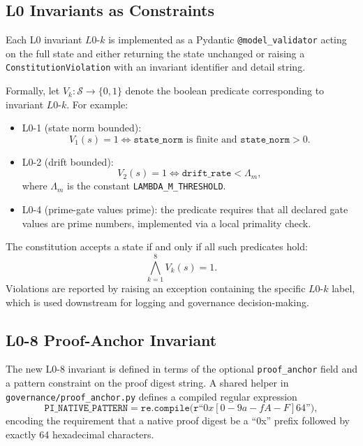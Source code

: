 \documentclass[11pt]{article}
\begin{document}
\subsection{L0 Invariants as Constraints}

Each L0 invariant \(L0\text{-}k\) is implemented as a Pydantic \texttt{@model\_validator} acting on the full state and either returning the state unchanged or raising a \texttt{ConstitutionViolation} with an invariant identifier and detail string.\cite{cite:40,cite:41,cite:42}

Formally, let \(V_k : \mathcal{S}\rightarrow\{0,1\}\) denote the boolean predicate corresponding to invariant \(L0\text{-}k\). For example:\cite{cite:40}
\begin{itemize}[nosep]
  \item L0-1 (state norm bounded):
  \[
    V_1(s) = 1 \iff \texttt{state\_norm} \text{ is finite and } \texttt{state\_norm} > 0.
  \]
  \item L0-2 (drift bounded):
  \[
    V_2(s) = 1 \iff \texttt{drift\_rate} < \Lambda_m,
  \]
  where \(\Lambda_m\) is the constant \texttt{LAMBDA\_M\_THRESHOLD}.\cite{cite:40}
  \item L0-4 (prime-gate values prime): the predicate requires that all declared gate values are prime numbers, implemented via a local primality check.\cite{cite:40}
\end{itemize}
The constitution accepts a state if and only if all such predicates hold:
\[
  \bigwedge_{k=1}^8 V_k(s) = 1.
\]
Violations are reported by raising an exception containing the specific \(L0\text{-}k\) label, which is used downstream for logging and governance decision-making.\cite{cite:40,cite:42}

\subsection{L0-8 Proof-Anchor Invariant}

The new L0-8 invariant is defined in terms of the optional \texttt{proof\_anchor} field and a pattern constraint on the proof digest string.\cite{cite:41} A shared helper in \texttt{governance/proof\_anchor.py} defines a compiled regular expression
\[
  \texttt{PI\_NATIVE\_PATTERN} = \texttt{re.compile(r``$0x[0-9a-fA-F]{64}$'')},
\]
encoding the requirement that a native proof digest be a ``0x'' prefix followed by exactly 64 hexadecimal characters.\cite{cite:41}
\end{document}

